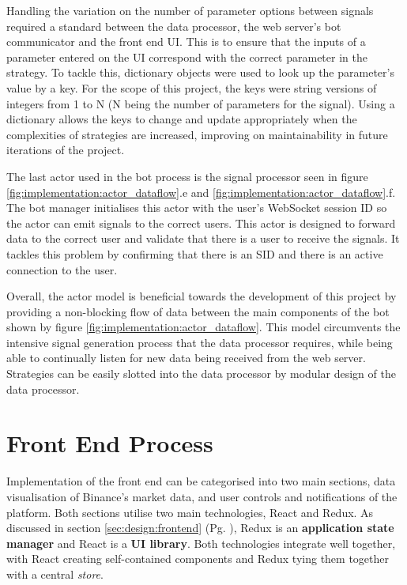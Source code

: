 
Handling the variation on the number of parameter options between signals required a standard between the data processor, the web server's bot communicator and the front end UI. This is to ensure that the inputs of a parameter entered on the UI correspond with the correct parameter in the strategy. To tackle this, dictionary objects were used to look up the parameter's value by a key. For the scope of this project, the keys were string versions of integers from 1 to N (N being the number of parameters for the signal). Using a dictionary allows the keys to change and update appropriately when the complexities of strategies are increased, improving on maintainability in future iterations of the project.

The last actor used in the bot process is the signal processor seen in figure \ref{fig:implementation:actor_dataflow}.e and \ref{fig:implementation:actor_dataflow}.f. The bot manager initialises this actor with the user's WebSocket session ID so the actor can emit signals to the correct users. This actor is designed to forward data to the correct user and validate that there is a user to receive the signals. It tackles this problem by confirming that there is an SID and there is an active connection to the user. 

Overall, the actor model is beneficial towards the development of this project by providing a non-blocking flow of data between the main components of the bot shown by figure \ref{fig:implementation:actor_dataflow}. This model circumvents the intensive signal generation process that the data processor requires, while being able to continually listen for new data being received from the web server. Strategies can be easily slotted into the data processor by modular design of the data processor. 



\section{Front End Process}
\label{sec:implementation:frontend}

\noindent Implementation of the front end can be categorised into two main sections, data visualisation of Binance's market data, and user controls and notifications of the platform. Both sections utilise two main technologies, React and Redux. As discussed in section \ref{sec:design:frontend} (Pg. \pageref{sec:design:frontend}), Redux is an \textbf{application state manager} and React is a \textbf{UI library}. Both technologies integrate well together, with React creating self-contained components and Redux tying them together with a central \textit{store}.

